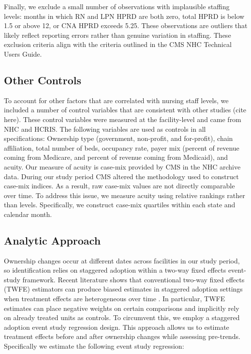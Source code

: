 \documentclass[12pt]{article}
\begin{document}
Finally, we exclude a small number of observations with implausible staffing levels: months in which RN and LPN HPRD are both zero, total HPRD is below 1.5 or above 12, or CNA HPRD exceeds 5.25. These observations are outliers that likely reflect reporting errors rather than genuine variation in staffing. These exclusion criteria align with the criteria outlined in the CMS NHC Technical Users Guide.

\subsection{Other Controls}

To account for other factors that are correlated with nursing staff levels, we included a number of control variables that are consistent with other studies (cite here). These control variables were measured at the facility-level and came from NHC and HCRIS. The following variables are used as controls in all specifications: Ownership type (government, non-profit, and for-profit), chain affiliation, total number of beds, occupancy rate, payer mix (percent of revenue coming from Medicare, and percent of revenue coming from Medicaid), and acuity. Our measure of acuity is case-mix provided by CMS in the NHC archive data. During our study period CMS altered the methodology used to construct case-mix indices. As a result, raw case-mix values are not directly comparable over time. To address this issue, we measure acuity using relative rankings rather than levels. Specifically, we construct case-mix quartiles within each state and calendar month.

\subsection{Analytic Approach}

Ownership changes occur at different dates across facilities in our study period, so identification relies on staggered adoption within a two-way fixed effects event-study framework. Recent literature shows that conventional two-way fixed effects (TWFE) estimators can produce biased estimates in staggered adoption settings when treatment effects are heterogeneous over time \citep{goodman_bacon_2021}. In particular, TWFE estimates can place negative weights on certain comparisons and implicitly rely on already treated units as controls. To circumvent this, we employ a staggered adoption event study regression design. This approach allows us to estimate treatment effects before and after ownership changes while assessing pre-trends. Specifically we estimate the following event study regression:
\end{document}
